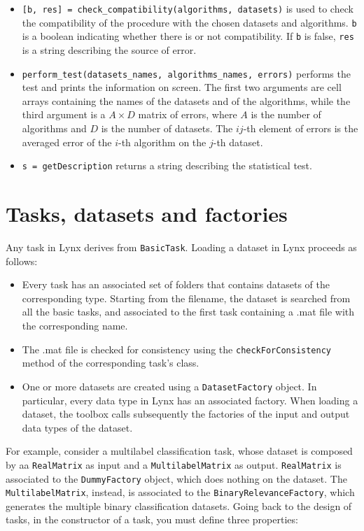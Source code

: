 \begin{itemize}
\item \verb|[b, res] = check_compatibility(algorithms, datasets)| is used
to check the compatibility of the procedure with the chosen datasets
and algorithms. \verb|b| is a boolean indicating whether there is or not
compatibility. If \verb|b| is false, \verb|res| is a string describing the source of error.
\item \verb|perform_test(datasets_names, algorithms_names, errors)| performs
the test and prints the information on screen. The first two arguments are cell arrays containing the names of the datasets and of the algorithms, while the third argument is a $A \times D$ matrix of errors, where $A$ is the number of algorithms and $D$ is the number of datasets. The $ij$-th element of errors is the averaged error of the $i$-th algorithm on the $j$-th dataset.
\item \verb|s = getDescription| returns a string describing the statistical test.
\end{itemize}

\section{Tasks, datasets and factories}

Any task in Lynx derives from \verb|BasicTask|. Loading a dataset in Lynx proceeds as follows:

\begin{itemize}
\item Every task has an associated set of folders that contains datasets of the corresponding type. Starting from the filename, the dataset is searched from all the basic tasks, and associated to the first task containing a .mat file with the corresponding name.
\item The .mat file is checked for consistency using the \verb|checkForConsistency| method of the corresponding task's class.
\item One or more datasets are created using a \verb|DatasetFactory| object. In particular, every data type in Lynx has an associated factory. When loading a dataset, the toolbox calls subsequently the factories of the input and output data types of the dataset.
\end{itemize}

\noindent For example, consider a multilabel classification task, whose dataset is composed by aa \verb|RealMatrix| as input and a \verb|MultilabelMatrix| as output. \verb|RealMatrix| is associated to the \verb|DummyFactory| object, which does nothing on the dataset. The \verb|MultilabelMatrix|, instead, is associated to the \verb|BinaryRelevanceFactory|, which generates the multiple binary classification datasets. Going back to the design of tasks, in the constructor of a task, you must define three properties:

